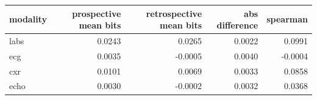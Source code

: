 \begin{tabular}{lrrrr}
\toprule
\textbf{modality} & \textbf{prospective mean bits} & \textbf{retrospective mean bits} & \textbf{abs difference} & \textbf{spearman} \\
\midrule
labs & 0.0243 & 0.0265 & 0.0022 & 0.0991 \\
ecg & 0.0035 & -0.0005 & 0.0040 & -0.0004 \\
cxr & 0.0101 & 0.0069 & 0.0033 & 0.0858 \\
echo & 0.0030 & -0.0002 & 0.0032 & 0.0368 \\
\bottomrule
\end{tabular}
